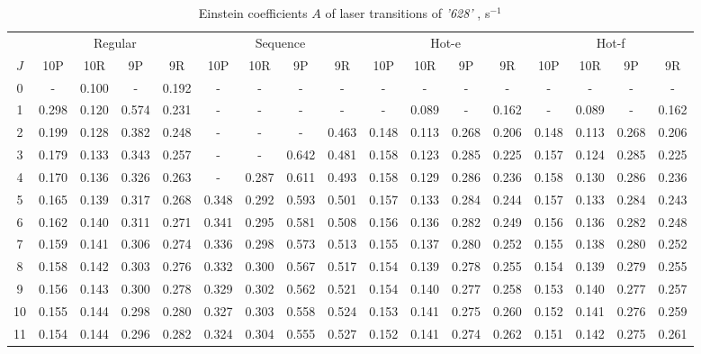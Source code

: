 \documentclass{report}
\begin{document}
\begin{appendices}
\begin{table}
\centering
\caption{Einstein coefficients $A$ of laser transitions of \textit{'628'} , s$^{-1}$}
\label{table:A628}
\scriptsize
\begin{tabular}{|c|cccc|cccc|cccc|cccc|}
\hline
& \multicolumn{4}{c|}{Regular}& \multicolumn{4}{c|}{Sequence}& \multicolumn{4}{c|}{Hot-e}& \multicolumn{4}{c|}{Hot-f}\\
$J$ & 10P & 10R & 9P & 9R & 10P & 10R & 9P & 9R & 10P & 10R & 9P & 9R & 10P & 10R & 9P & 9R\\ 
\hline
0  &   -   & 0.100 &   -   & 0.192 &   -   &   -   &   -   &   -   &   -   &   -   &   -   &   -   &   -   &   -   &   -   &   -  \\
1  & 0.298 & 0.120 & 0.574 & 0.231 &   -   &   -   &   -   &   -   &   -   & 0.089 &   -   & 0.162 &   -   & 0.089 &   -   & 0.162\\
2  & 0.199 & 0.128 & 0.382 & 0.248 &   -   &   -   &   -   & 0.463 & 0.148 & 0.113 & 0.268 & 0.206 & 0.148 & 0.113 & 0.268 & 0.206\\
3  & 0.179 & 0.133 & 0.343 & 0.257 &   -   &   -   & 0.642 & 0.481 & 0.158 & 0.123 & 0.285 & 0.225 & 0.157 & 0.124 & 0.285 & 0.225\\
4  & 0.170 & 0.136 & 0.326 & 0.263 &   -   & 0.287 & 0.611 & 0.493 & 0.158 & 0.129 & 0.286 & 0.236 & 0.158 & 0.130 & 0.286 & 0.236\\
5  & 0.165 & 0.139 & 0.317 & 0.268 & 0.348 & 0.292 & 0.593 & 0.501 & 0.157 & 0.133 & 0.284 & 0.244 & 0.157 & 0.133 & 0.284 & 0.243\\
6  & 0.162 & 0.140 & 0.311 & 0.271 & 0.341 & 0.295 & 0.581 & 0.508 & 0.156 & 0.136 & 0.282 & 0.249 & 0.156 & 0.136 & 0.282 & 0.248\\
7  & 0.159 & 0.141 & 0.306 & 0.274 & 0.336 & 0.298 & 0.573 & 0.513 & 0.155 & 0.137 & 0.280 & 0.252 & 0.155 & 0.138 & 0.280 & 0.252\\
8  & 0.158 & 0.142 & 0.303 & 0.276 & 0.332 & 0.300 & 0.567 & 0.517 & 0.154 & 0.139 & 0.278 & 0.255 & 0.154 & 0.139 & 0.279 & 0.255\\
9  & 0.156 & 0.143 & 0.300 & 0.278 & 0.329 & 0.302 & 0.562 & 0.521 & 0.154 & 0.140 & 0.277 & 0.258 & 0.153 & 0.140 & 0.277 & 0.257\\
10 & 0.155 & 0.144 & 0.298 & 0.280 & 0.327 & 0.303 & 0.558 & 0.524 & 0.153 & 0.141 & 0.275 & 0.260 & 0.152 & 0.141 & 0.276 & 0.259\\
11 & 0.154 & 0.144 & 0.296 & 0.282 & 0.324 & 0.304 & 0.555 & 0.527 & 0.152 & 0.141 & 0.274 & 0.262 & 0.151 & 0.142 & 0.275 & 0.261\\

\end{tabular}
\end{table}
\end{appendices}
\end{document}
